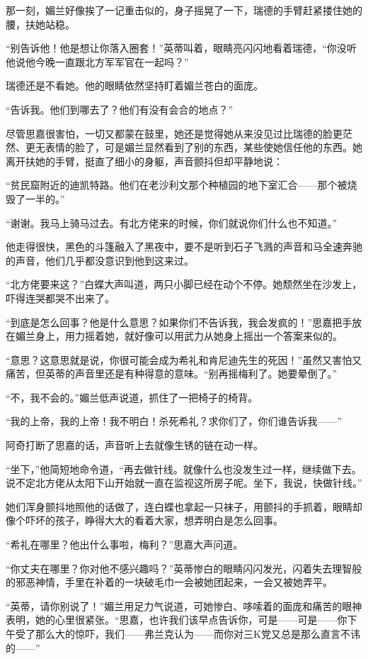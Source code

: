 \par 那一刻，媚兰好像挨了一记重击似的，身子摇晃了一下，瑞德的手臂赶紧搂住她的腰，扶她站稳。
\par “别告诉他！他是想让你落入圈套！”英蒂叫着，眼睛亮闪闪地看着瑞德，“你没听他说他今晚一直跟北方军军官在一起吗？”
\par 瑞德还是不看她。他的眼睛依然坚持盯着媚兰苍白的面庞。
\par “告诉我。他们到哪去了？他们有没有会合的地点？”
\par 尽管思嘉很害怕，一切又都蒙在鼓里，她还是觉得她从来没见过比瑞德的脸更茫然、更无表情的脸了，可是媚兰显然看到了别的东西，某些使她信任他的东西。她离开扶她的手臂，挺直了细小的身躯，声音颤抖但却平静地说：
\par “贫民窟附近的迪凯特路。他们在老沙利文那个种植园的地下室汇合——那个被烧毁了一半的。”
\par “谢谢。我马上骑马过去。有北方佬来的时候，你们就说你们什么也不知道。”
\par 他走得很快，黑色的斗篷融入了黑夜中，要不是听到石子飞溅的声音和马全速奔驰的声音，他们几乎都没意识到他到这来过。
\par “北方佬要来这？”白蝶大声叫道，两只小脚已经在动个不停。她颓然坐在沙发上，吓得连哭都哭不出来了。
\par “到底是怎么回事？他是什么意思？如果你们不告诉我，我会发疯的！”思嘉把手放在媚兰身上，用力摇着她，就好像可以用武力从她身上摇出一个答案来似的。
\par “意思？这意思就是说，你很可能会成为希礼和肯尼迪先生的死因！”虽然又害怕又痛苦，但英蒂的声音里还是有种得意的意味。“别再摇梅利了。她要晕倒了。”
\par “不，我不会的。”媚兰低声说道，抓住了一把椅子的椅背。
\par “我的上帝，我的上帝！我不明白！杀死希礼？求你们了，你们谁告诉我——”
\par 阿奇打断了思嘉的话，声音听上去就像生锈的链在动一样。
\par “坐下，”他简短地命令道，“再去做针线。就像什么也没发生过一样，继续做下去。说不定北方佬从太阳下山开始就一直在监视这所房子呢。坐下，我说，快做针线。”
\par 她们浑身颤抖地照他的话做了，连白蝶也拿起一只袜子，用颤抖的手抓着，眼睛却像个吓坏的孩子，睁得大大的看着大家，想弄明白是怎么回事。
\par “希礼在哪里？他出什么事啦，梅利？”思嘉大声问道。
\par “你丈夫在哪里？你对他不感兴趣吗？”英蒂惨白的眼睛闪闪发光，闪着失去理智般的邪恶神情，手里在补着的一块破毛巾一会被她团起来，一会又被她弄平。
\par “英蒂，请你别说了！”媚兰用足力气说道，可她惨白、哆嗦着的面庞和痛苦的眼神表明，她的心里很紧张。“思嘉，也许我们该早点告诉你，可是——可是——你下午受了那么大的惊吓，我们——弗兰克认为——而你对三K党又总是那么直言不讳的——”
